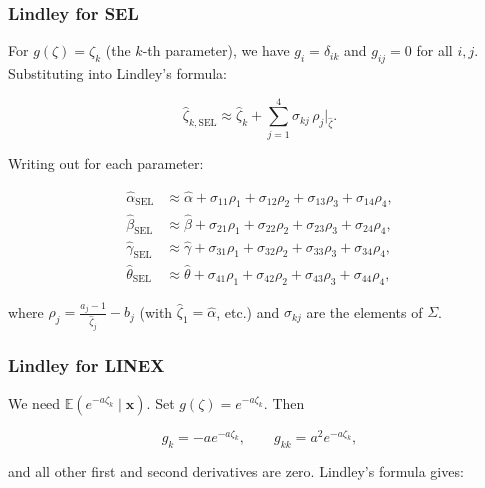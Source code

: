 \documentclass[12pt]{article}
\begin{document}
\subsubsection{Lindley for SEL}



For \(g(\zeta)=\zeta_k\) (the \(k\)-th parameter), we have \(g_i = \delta_{ik}\) and
\(g_{ij}=0\) for all \(i,j\). Substituting into Lindley's formula:



\[
\hat{\zeta}_{k,\text{SEL}} \approx \hat{\zeta}_k + \sum_{j=1}^{4} \sigma_{kj}\,\rho_j\big|_{\hat{\zeta}}.
\]



Writing out for each parameter:



\[
\begin{aligned}
\hat{\alpha}_{\text{SEL}} &\approx \hat{\alpha} + \sigma_{11}\rho_1 + \sigma_{12}\rho_2 + \sigma_{13}\rho_3 + \sigma_{14}\rho_4,\\
\hat{\beta}_{\text{SEL}}  &\approx \hat{\beta} + \sigma_{21}\rho_1 + \sigma_{22}\rho_2 + \sigma_{23}\rho_3 + \sigma_{24}\rho_4,\\
\hat{\gamma}_{\text{SEL}}  &\approx \hat{\gamma} + \sigma_{31}\rho_1 + \sigma_{32}\rho_2 + \sigma_{33}\rho_3 + \sigma_{34}\rho_4,\\
\hat{\theta}_{\text{SEL}}  &\approx \hat{\theta} + \sigma_{41}\rho_1 + \sigma_{42}\rho_2 + \sigma_{43}\rho_3 + \sigma_{44}\rho_4,
\end{aligned}
\]



where \(\rho_j = \frac{a_j-1}{\hat{\zeta}_j} - b_j\) (with \(\hat{\zeta}_1=\hat{\alpha}\), etc.)
and \(\sigma_{kj}\) are the elements of \(\Sigma\).



\subsubsection{Lindley for LINEX}



We need \(\mathbb{E}(e^{-a\zeta_k}\mid\mathbf{x})\). Set \(g(\zeta)=e^{-a\zeta_k}\). Then



\[
g_k = -a e^{-a\zeta_k},\qquad g_{kk} = a^2 e^{-a\zeta_k},
\]



and all other first and second derivatives are zero. Lindley's formula gives:
\end{document}
